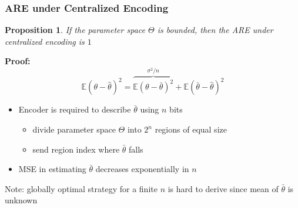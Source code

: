 \documentclass[mathserif]{beamer}
\newtheorem{prop}{Proposition}
\begin{document}
\begin{frame}
\frametitle{ARE under Centralized Encoding}

\begin{prop} If the parameter space $\Theta$ is bounded, then the ARE under centralized encoding is $1$
\end{prop}
\textbf{Proof:}
\[
\mathbb E \left( \theta- \widehat{\theta} \right)^2 = \overbrace{\mathbb E \left( \theta- \bar{\theta} \right)^2}^{\sigma^2/n} + \mathbb E \left( \bar{\theta}- \widehat{\theta} \right)^2 
\]
\begin{itemize}
\item Encoder is required to describe $\bar{\theta}$ using $n$ bits
\begin{itemize}
\item divide parameter space $\Theta$ into $2^n$ regions of equal size
\item send region index where $\bar{\theta}$ falls
\end{itemize}
\item MSE in estimating $\bar{\theta}$ decreases exponentially in $n$ 
\end{itemize}
\bigskip
Note: globally optimal strategy for a finite $n$ is hard to derive since mean of $\bar{\theta}$ is unknown 
\end{frame}
\end{document}
